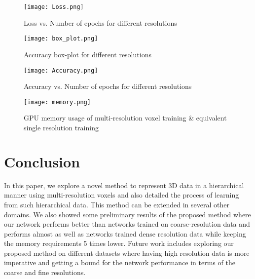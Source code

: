 \documentclass[10pt,letterpaper]{article}
\begin{document}

\begin{figure}[t]
 \centering
 \texttt{[image: Loss.png]}
 \caption{Loss vs. Number of epochs for different resolutions}
 \label{Fig:Loss} 
\end{figure}

\begin{figure}[h]

 \begin{minipage}{0.4\textwidth}
 \centering
 \texttt{[image: box\_plot.png]}
 \caption{Accuracy box-plot for different resolutions}
 \label{Fig:boxplot}
 \end{minipage}
 \hspace{50pt}
  \begin{minipage}{0.4\textwidth}
 \centering
 \texttt{[image: Accuracy.png]}
 \caption{Accuracy vs. Number of epochs for different resolutions}
 \label{Fig:accuracy}
 \end{minipage}
 
\end{figure}

\begin{figure}[h]
 \centering
 \texttt{[image: memory.png]}
 \caption{GPU memory usage of multi-resolution voxel training \& equivalent single resolution training}
 \label{Fig:memory}
\end{figure}


\section{Conclusion}
\label{Sec:Conclusions}

In this paper, we explore a novel method to represent 3D data in a hierarchical manner using multi-resolution voxels and also detailed the process of learning from such hierarchical data. This method can be extended in several other domains. We also showed some preliminary results of the proposed method where our network performs better than networks trained on coarse-resolution data and performs almost as well as networks trained dense resolution data while keeping the memory requirements 5 times lower. Future work includes exploring our proposed method on different datasets where having high resolution data is more imperative and getting a bound for the network performance in terms of the coarse and fine resolutions.





\end{document}
